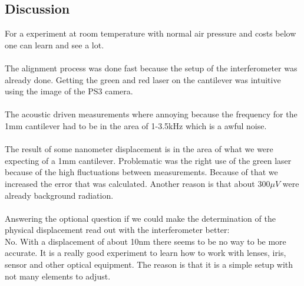 \documentclass[12pt,a4paper]{article}
\begin{document}
\begin{multicols}{2}
\section{Discussion}
For a experiment at room temperature with normal air pressure and costs below  one can learn and see a lot. \\
\\
The alignment process was done fast because the setup of the interferometer was already done. Getting the green and red laser on the cantilever was intuitive using the image of the PS3 camera. \\
\\
The acoustic driven measurements where annoying because the frequency for the 1mm cantilever had to be in the area of 1-3.5kHz which is a awful noise.\\
\\
The result of some nanometer displacement is in the area of what we were expecting of a 1mm cantilever. Problematic was the right use of the green laser because of the high fluctuations between measurements. Because of that we increased the error that was calculated. Another reason is that about 300$\mu V$ were already background radiation.\\
\\
Answering the optional question if we could make the determination of the physical displacement read out with the interferometer better:\\
No. With a displacement of about 10nm there seems to be no way to be more accurate. It is a really good experiment to learn how to work with lenses, iris, sensor and other optical equipment. The reason is that it is a simple setup with not many elements to adjust.





\end{multicols}
\end{document}
